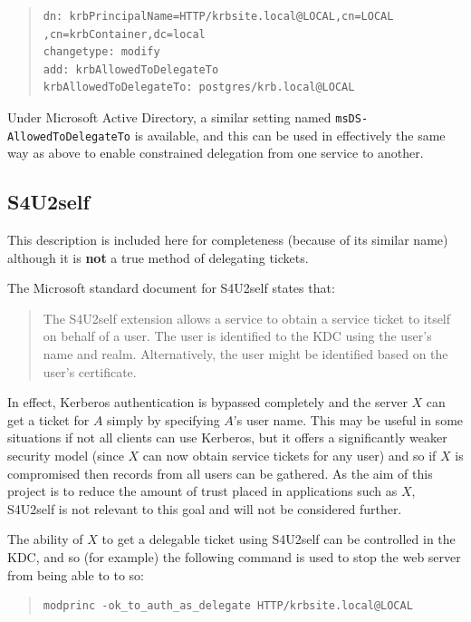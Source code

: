 \documentclass[12pt]{report}
\begin{document}
\begin{quote}
\begin{verbatim}
dn: krbPrincipalName=HTTP/krbsite.local@LOCAL,cn=LOCAL
,cn=krbContainer,dc=local
changetype: modify
add: krbAllowedToDelegateTo
krbAllowedToDelegateTo: postgres/krb.local@LOCAL
\end{verbatim}
\end{quote}

Under Microsoft Active Directory, a similar setting named \texttt{msDS-AllowedToDelegateTo} is available, and this can be used in effectively the same way as above to enable constrained delegation from one service to another\cite{MS-deleg-attribute}.

\subsection{S4U2self}
This description is included here for completeness (because of its similar name) although it is \textbf{not} a true method of delegating tickets.

The Microsoft standard document for S4U2self\cite{MS-s4u2} states that:

\begin{quote}
  The S4U2self extension allows a service to obtain a service ticket to itself on behalf of a user. The user is identified to the KDC using the user's name and realm. Alternatively, the user might be identified based on the user's certificate.
\end{quote}

In effect, Kerberos authentication is bypassed completely and the server $X$ can get a ticket for $A$ simply by specifying $A$'s user name. This may be useful in some situations if not all clients can use Kerberos, but it offers a significantly weaker security model (since $X$ can now obtain service tickets for any user) and so if $X$ is compromised then records from all users can be gathered. As the aim of this project is to reduce the amount of trust placed in applications such as $X$, S4U2self is not relevant to this goal and will not be considered further.

The ability of $X$ to get a delegable ticket using S4U2self can be controlled in the KDC, and so (for example) the following command is used to stop the web server from being able to to so:

\begin{quote}
\begin{verbatim}
modprinc -ok_to_auth_as_delegate HTTP/krbsite.local@LOCAL
\end{verbatim}
\end{quote}
\end{document}
